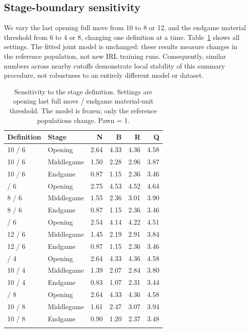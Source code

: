 \documentclass[11pt]{article}
\begin{document}
\subsection{Stage-boundary sensitivity}
We vary the last opening full move from 10 to 8 or 12, and the endgame material threshold from 6 to 4 or 8, changing one definition at a time. Table~\ref{tab:boundary} shows all settings. The fitted joint model is unchanged: these results measure changes in the reference population, not new IRL training runs. Consequently, similar numbers across nearby cutoffs demonstrate local stability of this summary procedure, not robustness to an entirely different model or dataset.
\begin{table}[htbp]\centering
\small
\caption{Sensitivity to the stage definition. Settings are opening last full move / endgame material-unit threshold. The model is frozen; only the reference populations change. Pawn = 1.}\label{tab:boundary}
\begin{tabular}{llrrrr}
\toprule
Definition & Stage & N & B & R & Q\\\midrule
10 / 6 & Opening & 2.64 & 4.33 & 4.36 & 4.58\\
10 / 6 & Middlegame & 1.50 & 2.28 & 2.96 & 3.87\\
10 / 6 & Endgame & 0.87 & 1.15 & 2.36 & 3.46\\
\addlinespace
8 / 6 & Opening & 2.75 & 4.53 & 4.52 & 4.64\\
8 / 6 & Middlegame & 1.55 & 2.36 & 3.01 & 3.90\\
8 / 6 & Endgame & 0.87 & 1.15 & 2.36 & 3.46\\
\addlinespace
12 / 6 & Opening & 2.54 & 4.14 & 4.22 & 4.51\\
12 / 6 & Middlegame & 1.45 & 2.19 & 2.91 & 3.84\\
12 / 6 & Endgame & 0.87 & 1.15 & 2.36 & 3.46\\
\addlinespace
10 / 4 & Opening & 2.64 & 4.33 & 4.36 & 4.58\\
10 / 4 & Middlegame & 1.39 & 2.07 & 2.84 & 3.80\\
10 / 4 & Endgame & 0.83 & 1.07 & 2.31 & 3.44\\
\addlinespace
10 / 8 & Opening & 2.64 & 4.33 & 4.36 & 4.58\\
10 / 8 & Middlegame & 1.61 & 2.47 & 3.07 & 3.94\\
10 / 8 & Endgame & 0.90 & 1.20 & 2.37 & 3.48\\
\addlinespace
\bottomrule\end{tabular}\end{table}
\end{document}
